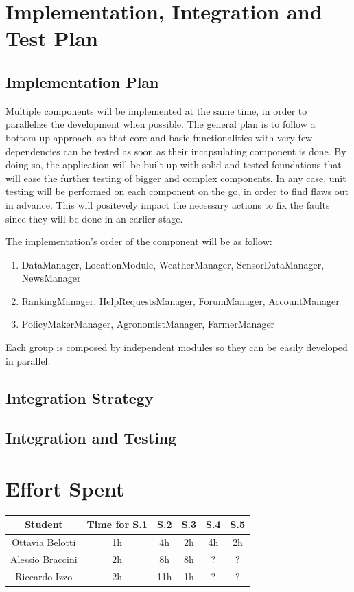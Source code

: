 \documentclass[table, 12pt]{article}
\begin{document}
\section{Implementation, Integration and Test Plan}
\subsection{Implementation Plan}
Multiple components will be implemented at the same time, in order to parallelize the development when possible. The general plan is to follow a bottom-up approach, so that core and basic functionalities with very few dependencies can be tested as soon as their incapsulating component is done. By doing so, the application will be built up with solid and tested foundations that will ease the further testing of bigger and complex components. In any case, unit testing will be performed on each component on the go, in order to find flaws out in advance. This will positevely impact the necessary actions to fix the faults since they will be done in an earlier stage.

The implementation's order of the component will be as follow:
\begin{enumerate}
    \item DataManager, LocationModule, WeatherManager, SensorDataManager, NewsManager
    \item RankingManager, HelpRequestsManager, ForumManager, AccountManager
    \item PolicyMakerManager, AgronomistManager, FarmerManager
\end{enumerate}
Each group is composed by independent modules so they can be easily developed in parallel.
\subsection{Integration Strategy}

\subsection{Integration and Testing}
\newpage
\section{Effort Spent}
    \begin{tabular}{| c || c | c| c| c |c|}
        \hline
        Student & Time for S.1 & S.2 & S.3 & S.4 & S.5\\ \hline
        Ottavia Belotti & 1h & 4h & 2h & 4h & 2h \\
        Alessio Braccini & 2h & 8h & 8h & ?  & ? \\
        Riccardo Izzo & 2h & 11h & 1h & ?  & ? \\
        \hline
    \end{tabular}
\end{document}
